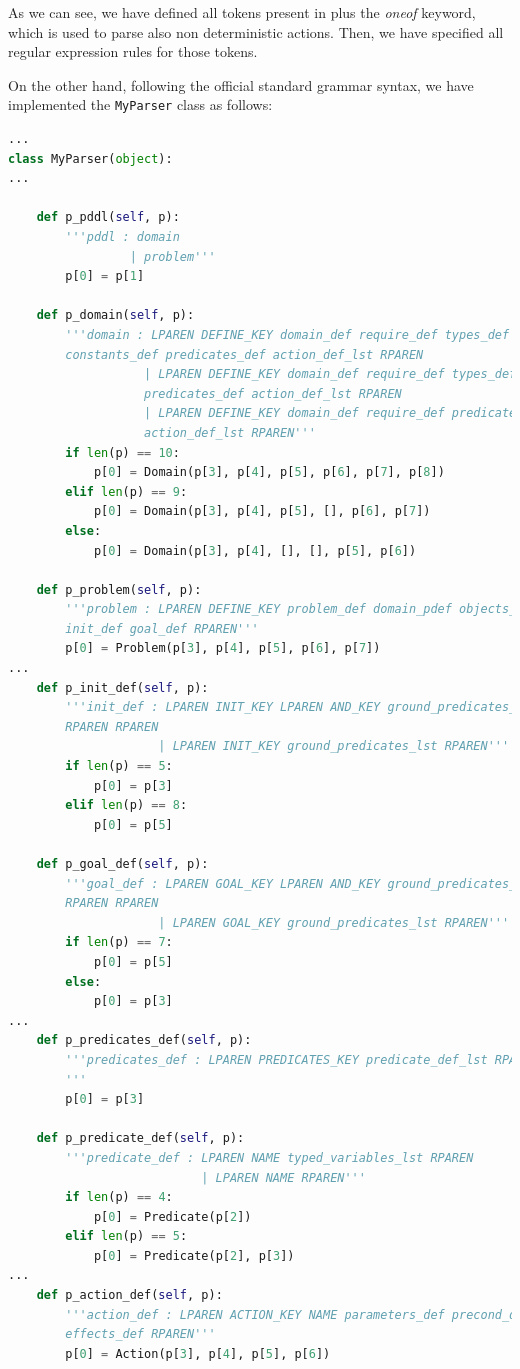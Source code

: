 As we can see, we have defined all tokens present in \PDDL plus the \textit{oneof} keyword, which is used to parse also non deterministic actions. Then, we have specified all regular expression rules for those tokens.

On the other hand, following the official \PDDL standard grammar syntax, we have implemented the \texttt{MyParser} class as follows:

\begin{lstlisting}[language=Python, style=Python, escapechar = £,  label={code:fond-parser}, caption={The \texttt{MyParser} class.}]
...
class MyParser(object):
...

    def p_pddl(self, p):
        '''pddl : domain
                 | problem'''
        p[0] = p[1]

    def p_domain(self, p):
        '''domain : LPAREN DEFINE_KEY domain_def require_def types_def 
        constants_def predicates_def action_def_lst RPAREN
                   | LPAREN DEFINE_KEY domain_def require_def types_def 
                   predicates_def action_def_lst RPAREN
                   | LPAREN DEFINE_KEY domain_def require_def predicates_def 
                   action_def_lst RPAREN'''
        if len(p) == 10:
            p[0] = Domain(p[3], p[4], p[5], p[6], p[7], p[8])
        elif len(p) == 9:
            p[0] = Domain(p[3], p[4], p[5], [], p[6], p[7])
        else:
            p[0] = Domain(p[3], p[4], [], [], p[5], p[6])

    def p_problem(self, p):
        '''problem : LPAREN DEFINE_KEY problem_def domain_pdef objects_def 
        init_def goal_def RPAREN'''
        p[0] = Problem(p[3], p[4], p[5], p[6], p[7])
...
    def p_init_def(self, p):
        '''init_def : LPAREN INIT_KEY LPAREN AND_KEY ground_predicates_lst 
        RPAREN RPAREN
                     | LPAREN INIT_KEY ground_predicates_lst RPAREN'''
        if len(p) == 5:
            p[0] = p[3]
        elif len(p) == 8:
            p[0] = p[5]

    def p_goal_def(self, p):
        '''goal_def : LPAREN GOAL_KEY LPAREN AND_KEY ground_predicates_lst 
        RPAREN RPAREN
                     | LPAREN GOAL_KEY ground_predicates_lst RPAREN'''
        if len(p) == 7:
            p[0] = p[5]
        else:
            p[0] = p[3]
...
    def p_predicates_def(self, p):
        '''predicates_def : LPAREN PREDICATES_KEY predicate_def_lst RPAREN
        '''
        p[0] = p[3]
        
    def p_predicate_def(self, p):
        '''predicate_def : LPAREN NAME typed_variables_lst RPAREN
                           | LPAREN NAME RPAREN'''
        if len(p) == 4:
            p[0] = Predicate(p[2])
        elif len(p) == 5:
            p[0] = Predicate(p[2], p[3])
...
    def p_action_def(self, p):
        '''action_def : LPAREN ACTION_KEY NAME parameters_def precond_def 
        effects_def RPAREN'''
        p[0] = Action(p[3], p[4], p[5], p[6])


\end{lstlisting}
